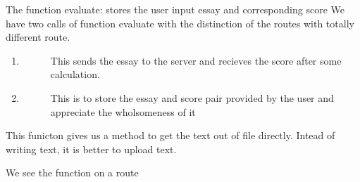 \documentclass[letterpaper,10pt,english]{sphinxmanual}
\begin{document}

\begin{fulllineitems}
\label{\detokenize{main:main.evaluate}}
The function evaluate: stores the user input essay and corresponding score
We have two calls of function evaluate with the distinction of the routes with totally different route.
\begin{enumerate}
%
\item {} \begin{description}
\item[{}] \leavevmode
This sends the essay to the server and recieves the score after some calculation.

\end{description}

\item {} \begin{description}
\item[{}] \leavevmode
This is to store the essay and score pair provided by the user and appreciate the wholsomeness of it

\end{description}

\end{enumerate}

\end{fulllineitems}


\begin{fulllineitems}
\label{\detokenize{main:main.evaluateFile}}
This funicton gives us a method to get the text out of file directly. Intead of writing text, it is better to upload text.

We see the function on a route 

\end{fulllineitems}
\end{document}
